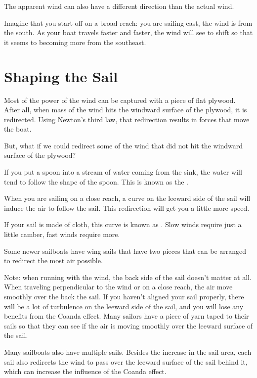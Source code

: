 The apparent wind can also have a different direction than the actual wind.

Imagine that you start off on a broad reach: you are sailing east,  the wind is from the south.  As your boat travels faster and faster,   the wind will see to shift so
that it seems to becoming more from the southeast.  

\section{Shaping the Sail}

Most of the power of the wind can be captured with a piece of flat plywood.  After all,  when mass of the wind hits the windward surface of the plywood,  it is redirected.  Using Newton's third law,  that redirection results in forces that move the boat.

But, what if we could redirect some of the wind that did not hit the windward surface of the plywood?

If you put a spoon into a stream of water coming from the sink,  the water will tend to follow the shape of the spoon.   This is known as the . 

When you are sailing on a close reach,   a curve on the leeward side of the sail will induce the air to follow the sail.   This redirection will get you 
a little more speed.

If your sail is made of cloth,   this curve is known as .  Slow winds require just a little camber,  fast winds require more.

Some newer sailboats have wing sails that have two pieces that can be arranged to redirect the most air possible.

Note: when running with the wind,  the back side of the sail doesn't matter at all.    When traveling perpendicular to the wind or on a close reach,  the air move smoothly over the back the sail.   If you haven't aligned your sail properly,  there will be a lot of turbulence on the leeward side of the sail,  and you 
will lose any benefits from the Coanda effect.  Many sailors have a piece of yarn taped to their sails so
that they can see if the air is moving smoothly over the leeward surface of the sail. 

Many sailboats also have multiple sails.  Besides the increase in the sail area,  each sail also redirects the wind to pass over the leeward surface of the sail
behind it, which can increase the influence of the Coanda effect.

